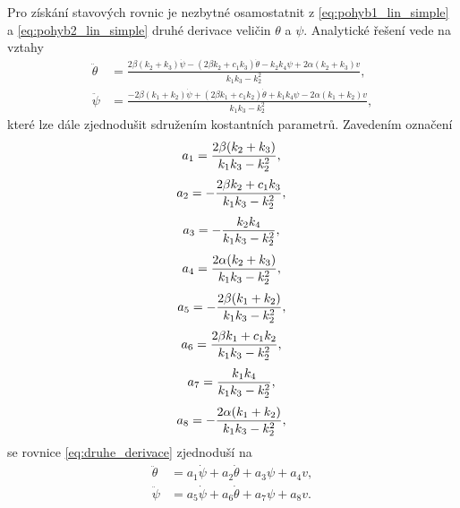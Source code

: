 \documentclass[conference]{IEEEtran}
\begin{document}
Pro získání stavových rovnic je nezbytné osamostatnit z \eqref{eq:pohyb1_lin_simple} a \eqref{eq:pohyb2_lin_simple}
druhé derivace veličin $\theta$ a $\psi$. Analytické řešení vede na vztahy
\begin{equation}
    \begin{split}
        \ddot{\theta} & = \frac{2\beta (k_2 + k_3) \dot{\psi}  - (2 \beta k_2 + c_1 k_3) \dot{\theta} - k_2 k_4 \psi + 2 \alpha (k_2 + k_3) v}{k_1 k_3 - k_2^2}, \\
        \ddot{\psi} &= \frac{- 2 \beta (k_1 + k_2) \dot{\psi} + (2 \beta k_1 + c_1 k_2)\dot{\theta}  + k_1 k_4 \psi - 2 \alpha (k_1 + k_2) v}{k_1 k_3 - k_2^2},
        \label{eq:druhe_derivace}
    \end{split}
\end{equation}
které lze dále zjednodušit sdružením kostantních parametrů. Zavedením označení
\begin{equation*}
    a_1 = \frac{2\beta (k_2 + k_3)}{k_1 k_3 - k_2^2}, \\
\end{equation*}
\begin{equation*}
    a_2 = -\frac{2 \beta k_2 + c_1 k_3}{k_1 k_3 - k_2^2}, \\
\end{equation*}
\begin{equation*}
    a_3 = -\frac{k_2 k_4}{k_1 k_3 - k_2^2}, \\
\end{equation*}
\begin{equation*}
    a_4 = \frac{2 \alpha (k_2 + k_3)}{k_1 k_3 - k_2^2}, \\
\end{equation*}
\begin{equation*}
    a_5 = -\frac{2 \beta (k_1 + k_2)}{k_1 k_3 - k_2^2}, \\
\end{equation*}
\begin{equation*}
    a_6 = \frac{2 \beta k_1 + c_1 k_2}{k_1 k_3 - k_2^2}, \\
\end{equation*}
\begin{equation*}
    a_7 = \frac{ k_1 k_4 }{k_1 k_3 - k_2^2}, \\
\end{equation*}
\begin{equation*}
    a_8 = -\frac{2 \alpha (k_1 + k_2)}{k_1 k_3 - k_2^2}, \\
\end{equation*}
se rovnice \eqref{eq:druhe_derivace} zjednoduší na
\begin{equation}
    \begin{split}
        \ddot{\theta} & = a_1 \dot{\psi} + a_2  \dot{\theta} + a_3  \psi + a_4  v, \\
        \ddot{\psi} &= a_5  \dot{\psi} + a_6  \dot {\theta} + a_7  \psi + a_8  v.
        \label{eq:druhe_derivace_easy}
    \end{split}
\end{equation}
\end{document}
